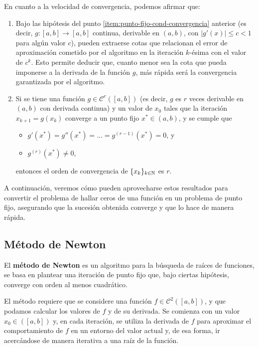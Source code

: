 En cuanto a la velocidad de convergencia, podemos afirmar que:

\begin{enumerate}[label=(\roman*),resume]
\item Bajo las hipótesis del punto \ref{item:punto-fijo-cond-convergencia}
    anterior (es decir, $g:[a,b] \to [a,b]$ continua, derivable en $(a,b)$,
    con $\lvert g'(x) \rvert \leq c < 1$ para algún valor $c$), pueden
    extraerse cotas que relacionan el error de aproximación cometido por el
    algoritmo en la iteración $k$-ésima con el valor de $c^k$. Esto permite
    deducir que, cuanto menor sea la cota que pueda imponerse a la derivada de
    la función $g$, más rápida será la convergencia garantizada por el
    algoritmo.

\item Si se tiene una función $g \in \mathcal{C}^r([a,b])$ (es decir, $g$ es
    $r$ veces derivable en $(a,b)$ con derivada continua) y un valor de $x_0$
    tales que la iteración $x_{k+1} = g(x_k)$ converge a un punto fijo $x^\ast
    \in (a,b)$, y se cumple que
    \begin{itemize}
    \item $g'(x^\ast) = g''(x^\ast) = \dots = g^{(r-1)}(x^\ast) = 0$, y
    \item $g^{(r)}(x^\ast) \neq 0$,
    \end{itemize}
    entonces el orden de convergencia de $\lbrace x_k \rbrace_{k \in \mathbb{N}}$
    es $r$.
\end{enumerate}

A continuación, veremos cómo pueden aprovecharse estos resultados para
convertir el problema de hallar ceros de una función en un problema de punto
fijo, asegurando que la sucesión obtenida converge y que lo hace de manera
rápida.

\subsection{Método de Newton}

El \textbf{método de Newton} es un algoritmo para la búsqueda de raíces de
funciones, se basa en plantear una iteración de punto fijo que, bajo ciertas
hipótesis, converge con orden al menos cuadrático.

El método requiere que se considere una función $f \in \mathcal{C}^2([a,b])$, y que
podamos calcular los valores de $f$ y de su derivada. Se comienza con un valor
$x_0 \in ([a,b])$ y, en cada iteración, se utiliza la derivada de $f$ para aproximar el
comportamiento de $f$ en un entorno del valor actual y, de esa forma,
ir acercándose de manera iterativa a una raíz de la función.

